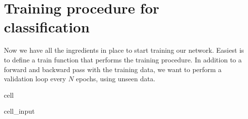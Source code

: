 \documentclass[letterpaper,10pt,english]{jupyterBook}
\begin{document}
\section{Training procedure for classification}
\label{\detokenize{notebooks/Tutorial2_ConvolutionalNeuralNetworks/Tutorial2_ConvolutionalNeuralNetworks_student:training-procedure-for-classification}}
\sphinxAtStartPar
Now we have all the ingredients in place to start training our network. Easiest is to define a train function that performs the training procedure. In addition to a forward and backward pass with the training data, we want to perform a validation loop every \(N\) epochs, using unseen data.

\begin{sphinxuseclass}{cell}\begin{sphinxVerbatimInput}

\begin{sphinxuseclass}{cell_input}
\begin{sphinxVerbatim}[commandchars=\\\{\}]
   

       
      \PYG{p}{[}\PYG{p}{]}
      \PYG{p}{[}\PYG{p}{]}

       
          
          


\end{sphinxVerbatim}
\end{sphinxuseclass}
\end{sphinxVerbatimInput}
\end{sphinxuseclass}
\end{document}
